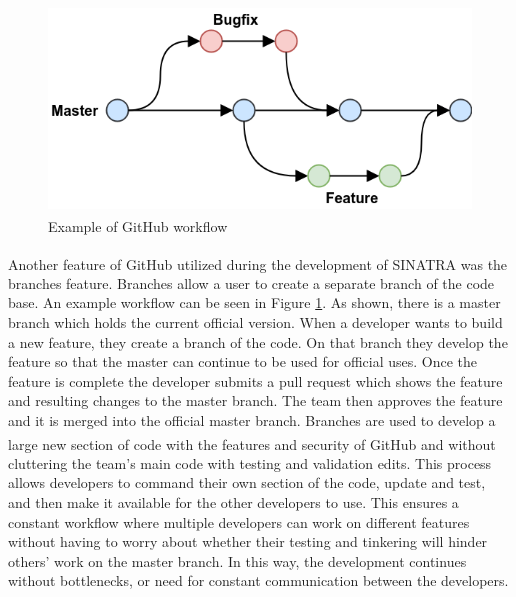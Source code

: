 \begin{figure}
\includegraphics[width=.99\textwidth]{figures/github-flow.png}
\centering
\caption[Example of GitHub\textsuperscript{\textregistered} workflow]{Example of GitHub\textsuperscript{\textregistered} workflow \textmd{\cite{github}}}
\label{fig:github}
\end{figure}




\indent Another feature of GitHub\textsuperscript{\textregistered} utilized during the development of SINATRA was the branches feature. Branches allow a user to create a separate branch of the code base. An example workflow can be seen in Figure \ref{fig:github}. As shown, there is a master branch which holds the current official version. When a developer wants to build a new feature, they create a branch of the code. On that branch they develop the feature so that the master can continue to be used for official uses. Once the feature is complete the developer submits a pull request which shows the feature and resulting changes to the master branch. The team then approves the feature and it is merged into the official master branch. Branches are used to develop a large new section of code with the features and security of GitHub\textsuperscript{\textregistered} and without cluttering the team's main code with testing and validation edits. This process allows developers to command their own section of the code, update and test, and then make it available for the other developers to use. This ensures a constant workflow where multiple developers can work on different features without having to worry about whether their testing and tinkering will hinder others' work on the master branch. In this way, the development continues without bottlenecks, or need for constant communication between the developers. \par


